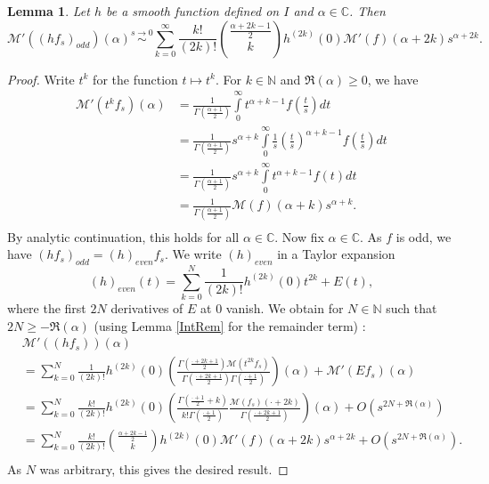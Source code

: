 \documentclass[10pt,a4paper]{amsart}
\newtheorem{lemma}{Lemma}
\def\C{{\mathbb{C}}}
\def\M{\mathcal{M}}
\def\N{{\mathbb{N}}}
\def\insum#1{\sum\limits_{#1=0}^\infty}
\def\intP{\int\limits_0^\infty}
\begin{document}
\begin{lemma}
	\label{MsExp}
	Let $h$ be a smooth function defined on $I$ and $\alpha\in \C$. Then
	\[\M'( (hf_s)_{odd})(\alpha)\stackrel{s\rightarrow 0}{\sim}\insum{k}\frac{k!}{(2k)!}\binom{\frac{\alpha+2k-1}{2}}{k}h^{(2k)}(0) \M'(f)(\alpha+2k)s^{\alpha+2k}.\]
\end{lemma}

\begin{proof}	
	Write $t^k$ for the function $t\mapsto t^k$. For $k\in \N$ and $\Re(\alpha)\geq 0$, we have 
	\begin{align*}
		\M' (t^k f_s)(\alpha)&=\frac{1}{\Gamma(\frac{\alpha+1}{2})}\intP t^{\alpha+k-1}f\left(\frac{t}{s}\right)dt\\
		&=\frac{1}{\Gamma(\frac{\alpha+1}{2})}s^{\alpha+k}\intP\frac{1}{s}\left( \frac{t}{s}\right)^{\alpha+k-1}f\left(\frac{t}{s}\right)dt\\
		&=\frac{1}{\Gamma(\frac{\alpha+1}{2})}s^{\alpha+k}\intP t^{\alpha+k-1}f(t)dt\\
		&= \frac{1}{\Gamma(\frac{\alpha+1}{2})}\M(f)(\alpha+k)s^{\alpha+k}.\\
	\end{align*}
	By analytic continuation, this holds for all $\alpha\in \C$. Now fix $\alpha\in \C$. As $f$ is odd, we have $(hf_s)_{odd}=(h)
	_{even}f_s$.
	We write $(h)_{even}$ in a Taylor expansion
	\[(h)_{even}(t)=\sum\limits_{k=0}^N\frac{1}{(2k)!}h^{(2k)}(0)t^{2k}+ E(t),\]
	where the first $2N$ derivatives of $E$ at $0$ vanish.
	We obtain for $N\in \N$ such that $2N\geq-\Re(\alpha)$ (using Lemma \ref{IntRem} for the remainder term) :
	\begin{align*}
		&\M'((hf_s))(\alpha)\\
		&=\sum\limits_{k=0}^N\frac{1}{(2k)!}h^{(2k)}(0)  \left(\frac{\Gamma(\frac{\cdot+2k+1}{2})\M (t^{2k}f_s)}{\Gamma(\frac{\cdot+2k+1}{2})\Gamma(\frac{\cdot+1}{2})}\right)(\alpha)
		+ \M' ( Ef_s)(\alpha)\\
		&=\sum\limits_{k=0}^N\frac{k!}{(2k)!}h^{(2k)}(0)  \left(\frac{\Gamma(\frac{\cdot+1}{2}+k)}{k!\Gamma(\frac{\cdot+1}{2})}\frac{\M (f_s)(\cdot+2k)}{\Gamma(\frac{\cdot+2k+1}{2})}\right)(\alpha)
		+ O(s^{2N+\Re(\alpha)})\\
		&=\sum\limits_{k=0}^N\frac{k!}{(2k)!}\binom{\frac{\alpha+2k-1}{2}}{k}h^{(2k)}(0) \M'(f)(\alpha+2k)s^{\alpha+2k}+ O(s^{2N+\Re(\alpha)}).\\
	\end{align*}
	As $N$ was arbitrary, this gives the desired result.
\end{proof}
\end{document}
